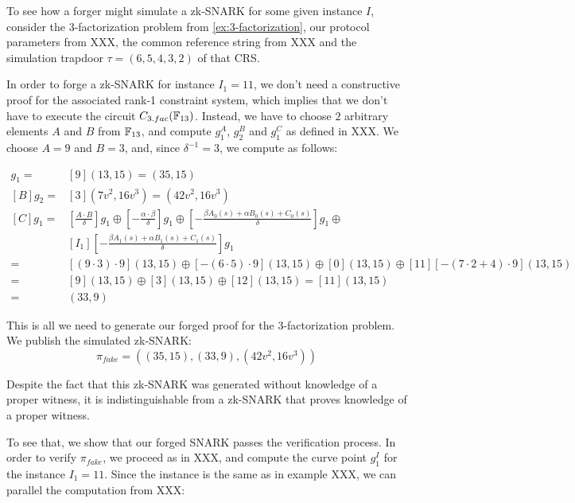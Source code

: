 \begin{example} To see how a forger might simulate a  
zk-SNARK for some given instance $I$, consider the $3$-factorization problem from  \ref{ex:3-factorization}, our protocol parameters from XXX, the common reference string from XXX and the simulation trapdoor $\tau = (6,5,4,3,2)$ of that CRS.

In order to forge a zk-SNARK for instance $I_1=11$, we don't need a constructive proof for the associated rank-1 constraint system, which implies that we don't have to execute the circuit $C_{3.fac}(\mathbb{F}_{13})$. Instead, we have to choose $2$ arbitrary elements $A$ and $B$ from $\mathbb{F}_{13}$, and compute $g_1^A$, $g_2^B$ and $g_1^C$ as defined in XXX. We choose $A=9$ and $B=3$, and, since $\delta^{-1}=3$, we compute as follows:

\begin{align*}
[A]g_1 =& [9](13,15) = (35,15)\\
[B]g_2 =& [3](7v^2,16v^3) = (42v^2,16v^3)\\
[C]g_1 =& [\frac{A\cdot B}{\delta}]g_1\oplus 
           [-\frac{\alpha\cdot\beta}{\delta}]g_1\oplus 
      [-\frac{\beta A_0(s) + \alpha B_0(s)+ C_0(s)}{\delta}]g_1\oplus\\
      &[I_1][-\frac{\beta A_1(s) + \alpha B_1(s)+ C_1(s)}{\delta}]g_1\\      
     = & [(9\cdot 3)\cdot 9 ](13,15)\oplus 
      [-(6\cdot 5)\cdot 9](13,15)\oplus 
      [0](13,15)\oplus 
      [11][-(7\cdot 2 + 4)\cdot 9](13,15)\\      
     = &[9](13,15)\oplus [3](13,15)\oplus [12](13,15)= [11](13,15)\\       
     = &(33,9)
\end{align*}

This is all we need to generate our forged proof for the $3$-factorization problem. We publish the simulated zk-SNARK:
$$
\pi_{fake}=((35,15),(33,9),(42v^2,16v^3))
$$

Despite the fact that this zk-SNARK was generated without knowledge of a proper witness, it is indistinguishable from a zk-SNARK that proves knowledge of a proper witness. 

To see that, we show that our forged SNARK passes the verification process. In order to verify $\pi_{fake}$, we proceed as in XXX, and compute the curve point $g_1^I$ for the instance $I_1=11$. Since the instance is the same as in example XXX, we can parallel the computation from XXX:


\end{example}
